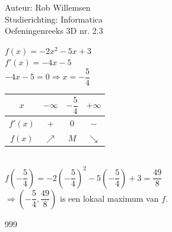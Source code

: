 \documentclass[a4paper]{article}
\begin{document}
\noindent \large Auteur: Rob Willemsen \\
\noindent \large Studierichting: Informatica \\
\noindent \large Oefeningenreeks 3D nr. 2.3 \\

\medskip

\normalsize

$f(x) = -2x^2 - 5x +3$ \\

$f'(x) = -4x - 5$ \\

$-4x - 5 = 0 \Rightarrow x = -\dfrac{5}{4}$ \\

\begin{tabular}{c|ccc}
$x$ & $-\infty$ & $-\dfrac{5}{4}$ & $+\infty$\\ \hline
$f'(x)$ & $+$ & $0$ & $-$ \\
$f(x)$ & $\nearrow$ & $M$ & $\searrow$ \\
\end{tabular} \\

$f\left(-\dfrac{5}{4}\right) = -2\left(-\dfrac{5}{4}\right)^2 - 5\left(-\dfrac{5}{4}\right) + 3 = \dfrac{49}{8}$ \\

$\Rightarrow \left(-\dfrac{5}{4}, \dfrac{49}{8}\right)$ is een lokaal maximum van $f$. \\

\begin{thebibliography}{999}
\end{thebibliography}
\end{document}
